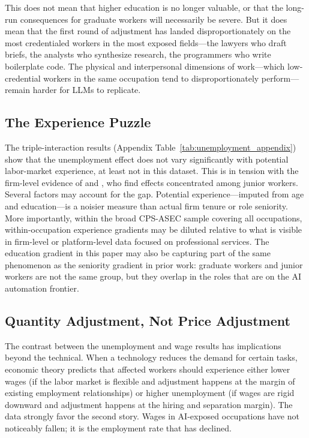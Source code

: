 \documentclass[11pt]{article}
\begin{document}
This does not mean that higher education is no longer valuable, or that the long-run consequences for graduate workers will necessarily be severe. But it does mean that the first round of adjustment has landed disproportionately on the most credentialed workers in the most exposed fields---the lawyers who draft briefs, the analysts who synthesize research, the programmers who write boilerplate code. The physical and interpersonal dimensions of work---which low-credential workers in the same occupation tend to disproportionately perform---remain harder for LLMs to replicate.

\subsection{The Experience Puzzle}

The triple-interaction results (Appendix Table~\ref{tab:unemployment_appendix}) show that the unemployment effect does not vary significantly with potential labor-market experience, at least not in this dataset. This is in tension with the firm-level evidence of \textcite{hosseini2025seniority} and \textcite{brynjolfsson2025canaries}, who find effects concentrated among junior workers. Several factors may account for the gap. Potential experience---imputed from age and education---is a noisier measure than actual firm tenure or role seniority. More importantly, within the broad CPS-ASEC sample covering all occupations, within-occupation experience gradients may be diluted relative to what is visible in firm-level or platform-level data focused on professional services. The education gradient in this paper may also be capturing part of the same phenomenon as the seniority gradient in prior work: graduate workers and junior workers are not the same group, but they overlap in the roles that are on the AI automation frontier.

\subsection{Quantity Adjustment, Not Price Adjustment}

The contrast between the unemployment and wage results has implications beyond the technical. When a technology reduces the demand for certain tasks, economic theory predicts that affected workers should experience either lower wages (if the labor market is flexible and adjustment happens at the margin of existing employment relationships) or higher unemployment (if wages are rigid downward and adjustment happens at the hiring and separation margin). The data strongly favor the second story. Wages in AI-exposed occupations have not noticeably fallen; it is the employment rate that has declined.
\end{document}
